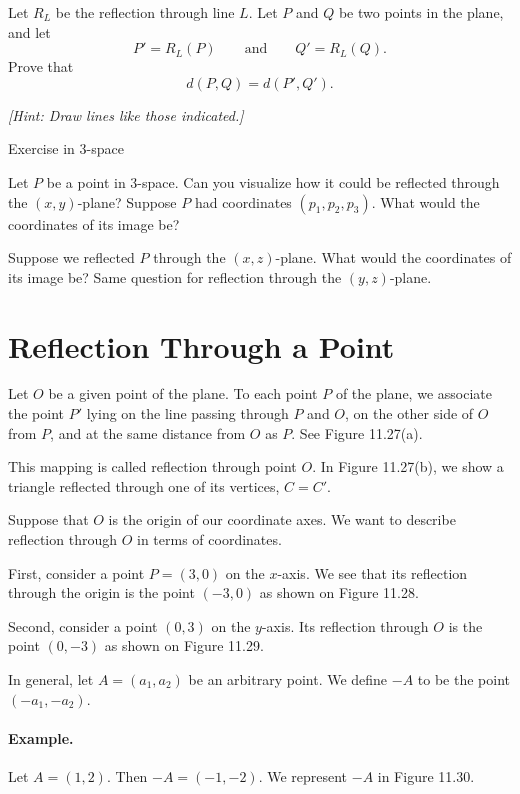 \documentclass[12pt]{book} %
\begin{document}
\begin{ExerciseList}
\begin{ExerciseList}
\Exercise Let $R_L$ be the reflection through line $L$. Let $P$ and $Q$ be two points in the plane, and let
\[
P'=R_L(P)
\qquad \text{and} \qquad
Q'=R_L(Q).
\]
Prove that
\[
d(P,Q)=d(P',Q').
\]


\textit{[Hint: Draw lines like those indicated.]}

\Exercise Exercise in 3-space

Let $P$ be a point in 3-space. Can you visualize how it could be reflected through the $(x,y)$-plane? Suppose $P$ had coordinates $(p_1,p_2,p_3)$. What would the coordinates of its image be?

Suppose we reflected $P$ through the $(x,z)$-plane. What would the coordinates of its image be? Same question for reflection through the $(y,z)$-plane.
\end{ExerciseList}

\section{Reflection Through a Point}

Let $O$ be a given point of the plane. To each point $P$ of the plane, we associate the point $P'$ lying on the line passing through $P$ and $O$, on the other side of $O$ from $P$, and at the same distance from $O$ as $P$. See Figure 11.27(a).


This mapping is called reflection through point $O$. In Figure 11.27(b), we show a triangle reflected through one of its vertices, $C=C'$.

Suppose that $O$ is the origin of our coordinate axes. We want to describe reflection through $O$ in terms of coordinates.

First, consider a point $P=(3,0)$ on the $x$-axis. We see that its reflection through the origin is the point $(-3,0)$ as shown on Figure 11.28.


Second, consider a point $(0,3)$ on the $y$-axis. Its reflection through $O$ is the point $(0,-3)$ as shown on Figure 11.29.


In general, let $A=(a_1,a_2)$ be an arbitrary point. We define $-A$ to be the point $(-a_1,-a_2)$.

\paragraph{Example.}
Let $A=(1,2)$. Then $-A=(-1,-2)$. We represent $-A$ in Figure 11.30.


\end{ExerciseList}
\end{document}

